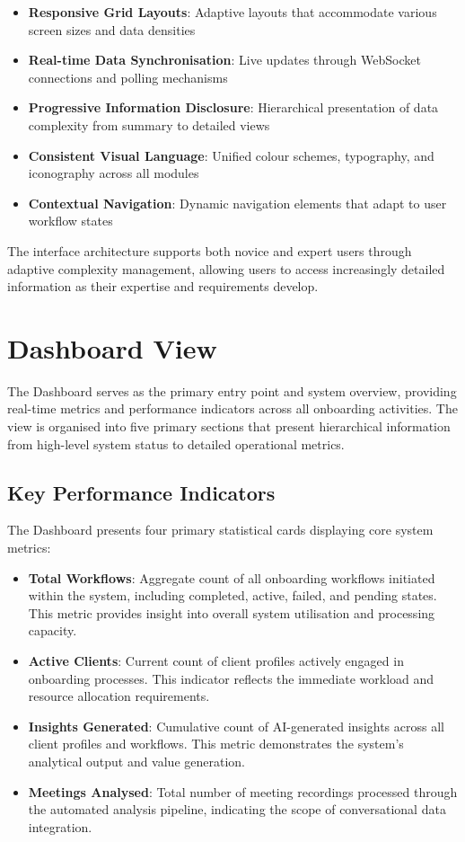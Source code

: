 \documentclass{article}
\begin{document}
\begin{itemize}
    \item \textbf{Responsive Grid Layouts}: Adaptive layouts that accommodate various screen sizes and data densities
    \item \textbf{Real-time Data Synchronisation}: Live updates through WebSocket connections and polling mechanisms
    \item \textbf{Progressive Information Disclosure}: Hierarchical presentation of data complexity from summary to detailed views
    \item \textbf{Consistent Visual Language}: Unified colour schemes, typography, and iconography across all modules
    \item \textbf{Contextual Navigation}: Dynamic navigation elements that adapt to user workflow states
\end{itemize}

The interface architecture supports both novice and expert users through adaptive complexity management, allowing users to access increasingly detailed information as their expertise and requirements develop.

\section{Dashboard View}
The Dashboard serves as the primary entry point and system overview, providing real-time metrics and performance indicators across all onboarding activities. The view is organised into five primary sections that present hierarchical information from high-level system status to detailed operational metrics.

\subsection{Key Performance Indicators}
The Dashboard presents four primary statistical cards displaying core system metrics:

\begin{itemize}
    \item \textbf{Total Workflows}: Aggregate count of all onboarding workflows initiated within the system, including completed, active, failed, and pending states. This metric provides insight into overall system utilisation and processing capacity.
    \item \textbf{Active Clients}: Current count of client profiles actively engaged in onboarding processes. This indicator reflects the immediate workload and resource allocation requirements.
    \item \textbf{Insights Generated}: Cumulative count of AI-generated insights across all client profiles and workflows. This metric demonstrates the system's analytical output and value generation.
    \item \textbf{Meetings Analysed}: Total number of meeting recordings processed through the automated analysis pipeline, indicating the scope of conversational data integration.
\end{itemize}
\end{document}
